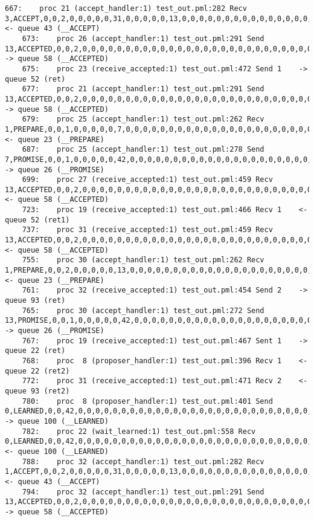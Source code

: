\begin{lstlisting}[xleftmargin=.01\linewidth, xrightmargin=0.01\linewidth, caption={Message passing caused by the proposer's protocol bug.}, label={lst:paxos_bug}]
    667:    proc 21 (accept_handler:1) test_out.pml:282 Recv 3,ACCEPT,0,0,2,0,0,0,0,0,31,0,0,0,0,0,13,0,0,0,0,0,0,0,0,0,0,0,0,0,0,0,0,0,0,0,0,0     <- queue 43 (__ACCEPT)
    673:    proc 26 (accept_handler:1) test_out.pml:291 Send 13,ACCEPTED,0,0,2,0,0,0,0,0,0,0,0,0,0,0,0,0,0,0,0,0,0,0,0,0,0,0,0,0,0,0,0,0,0,0,0,0    -> queue 58 (__ACCEPTED)
    675:    proc 23 (receive_accepted:1) test_out.pml:472 Send 1    -> queue 52 (ret)
    677:    proc 21 (accept_handler:1) test_out.pml:291 Send 13,ACCEPTED,0,0,2,0,0,0,0,0,0,0,0,0,0,0,0,0,0,0,0,0,0,0,0,0,0,0,0,0,0,0,0,0,0,0,0,0    -> queue 58 (__ACCEPTED)
    679:    proc 25 (accept_handler:1) test_out.pml:262 Recv 1,PREPARE,0,0,1,0,0,0,0,0,7,0,0,0,0,0,0,0,0,0,0,0,0,0,0,0,0,0,0,0,0,0,0,0,0,0,0,0      <- queue 23 (__PREPARE)
    687:    proc 25 (accept_handler:1) test_out.pml:278 Send 7,PROMISE,0,0,1,0,0,0,0,0,42,0,0,0,0,0,0,0,0,0,0,0,0,0,0,0,0,0,0,0,0,0,0,0,0,0,0,0     -> queue 26 (__PROMISE)
    699:    proc 27 (receive_accepted:1) test_out.pml:459 Recv 13,ACCEPTED,0,0,2,0,0,0,0,0,0,0,0,0,0,0,0,0,0,0,0,0,0,0,0,0,0,0,0,0,0,0,0,0,0,0,0,0  <- queue 58 (__ACCEPTED)
    723:    proc 19 (receive_accepted:1) test_out.pml:466 Recv 1    <- queue 52 (ret1)
    737:    proc 31 (receive_accepted:1) test_out.pml:459 Recv 13,ACCEPTED,0,0,2,0,0,0,0,0,0,0,0,0,0,0,0,0,0,0,0,0,0,0,0,0,0,0,0,0,0,0,0,0,0,0,0,0  <- queue 58 (__ACCEPTED)
    755:    proc 30 (accept_handler:1) test_out.pml:262 Recv 1,PREPARE,0,0,2,0,0,0,0,0,13,0,0,0,0,0,0,0,0,0,0,0,0,0,0,0,0,0,0,0,0,0,0,0,0,0,0,0     <- queue 23 (__PREPARE)
    761:    proc 32 (receive_accepted:1) test_out.pml:454 Send 2    -> queue 93 (ret)
    765:    proc 30 (accept_handler:1) test_out.pml:272 Send 13,PROMISE,0,0,1,0,0,0,0,0,42,0,0,0,0,0,0,0,0,0,0,0,0,0,0,0,0,0,0,0,0,0,0,0,0,0,0,0    -> queue 26 (__PROMISE)
    767:    proc 19 (receive_accepted:1) test_out.pml:467 Sent 1    -> queue 22 (ret)
    768:    proc  8 (proposer_handler:1) test_out.pml:396 Recv 1    <- queue 22 (ret2)
    772:    proc 31 (receive_accepted:1) test_out.pml:471 Recv 2    <- queue 93 (ret2)
    780:    proc  8 (proposer_handler:1) test_out.pml:401 Send 0,LEARNED,0,0,42,0,0,0,0,0,0,0,0,0,0,0,0,0,0,0,0,0,0,0,0,0,0,0,0,0,0,0,0,0,0,0,0,0   -> queue 100 (__LEARNED)
    782:    proc 22 (wait_learned:1) test_out.pml:558 Recv 0,LEARNED,0,0,42,0,0,0,0,0,0,0,0,0,0,0,0,0,0,0,0,0,0,0,0,0,0,0,0,0,0,0,0,0,0,0,0,0       <- queue 100 (__LEARNED)
    788:    proc 32 (accept_handler:1) test_out.pml:282 Recv 1,ACCEPT,0,0,2,0,0,0,0,0,31,0,0,0,0,0,13,0,0,0,0,0,0,0,0,0,0,0,0,0,0,0,0,0,0,0,0,0     <- queue 43 (__ACCEPT)
    794:    proc 32 (accept_handler:1) test_out.pml:291 Send 13,ACCEPTED,0,0,2,0,0,0,0,0,0,0,0,0,0,0,0,0,0,0,0,0,0,0,0,0,0,0,0,0,0,0,0,0,0,0,0,0    -> queue 58 (__ACCEPTED)

\end{lstlisting}
